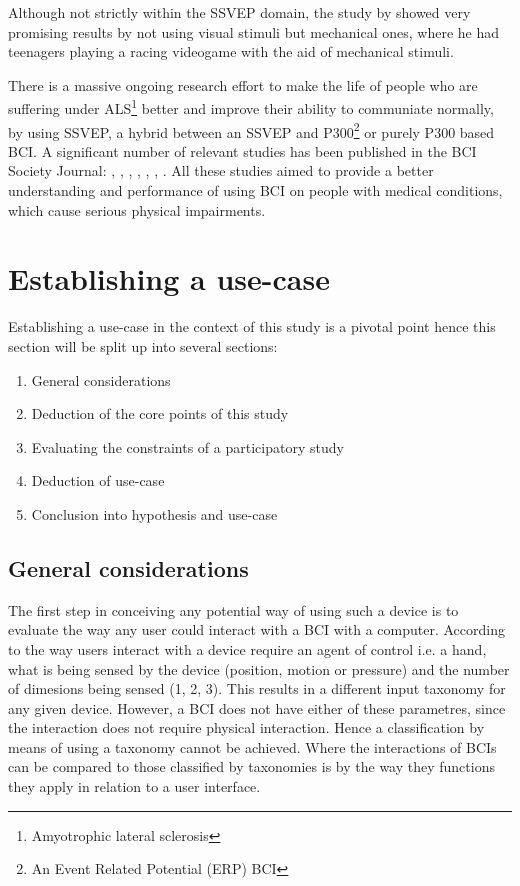            Although not strictly within the SSVEP domain, the study by \cite{Beveridge.2017} showed very promising results by not using visual stimuli but mechanical ones, where he had teenagers playing a racing videogame with the aid of mechanical stimuli.

            There is a massive ongoing research effort to make the life of people who are suffering under ALS\footnote{Amyotrophic lateral sclerosis} better and improve their ability to communiate normally, by using SSVEP, a hybrid between an SSVEP and P300\footnote{An Event Related Potential (ERP) BCI} or purely P300 based BCI. A significant number of relevant studies has been published in the BCI Society Journal: \cite{Sugata.2016}, \cite{Holz.2015}, \cite{Speier.2017}, \cite{Geronimo.2017}, \cite{Speier.2018}, \cite{Mowla.2017}, \cite{Huggins.2016}. All these studies aimed to provide a better understanding and performance of using BCI on people with medical conditions, which cause serious physical impairments.

        \section{Establishing a use-case}\label{use-case-main}

            Establishing a use-case in the context of this study is a pivotal point hence this section will be split up into several sections: 

            \begin{enumerate}
                \item General considerations
                \item Deduction of the core points of this study
                \item Evaluating the constraints of a participatory study
                \item Deduction of use-case
                \item Conclusion into hypothesis and use-case
            \end{enumerate}

            \subsection{General considerations}\label{general-considerations}

                The first step in conceiving any potential way of using such a device is to evaluate the way any user could interact with a BCI with a computer. According to \cite[4.13]{Buxton.2010} the way users interact with a device require an agent of control i.e. a hand, what is being sensed by the device (position, motion or pressure) and the number of dimesions being sensed (1, 2, 3). This results in a different input taxonomy for any given device. However, a BCI does not have either of these parametres, since the interaction does not require physical interaction. Hence a classification by means of using a taxonomy cannot be achieved. Where the interactions of BCIs can be compared to those classified by taxonomies is by the way they functions they apply in relation to a user interface.

